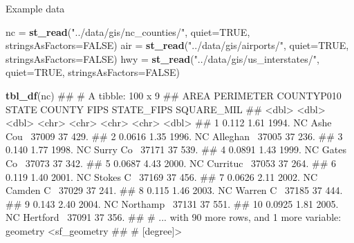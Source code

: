 \documentclass[11pt,ignorenonframetext,]{beamer}
\newenvironment{Shaded}{}{}
\newcommand{\DataTypeTok}[1]{\textcolor[rgb]{0.56,0.13,0.00}{#1}}
\newcommand{\KeywordTok}[1]{\textcolor[rgb]{0.00,0.44,0.13}{\textbf{#1}}}
\newcommand{\NormalTok}[1]{#1}
\newcommand{\OtherTok}[1]{\textcolor[rgb]{0.00,0.44,0.13}{#1}}
\newcommand{\StringTok}[1]{\textcolor[rgb]{0.25,0.44,0.63}{#1}}
\let\oldShaded\Shaded
\let\endoldShaded\endShaded
\renewenvironment{Shaded}{\footnotesize\begin{spacing}{0.9}\oldShaded}{\endoldShaded\end{spacing}}
\let\oldverbatim\verbatim
\let\endoldverbatim\endverbatim
\newcommand{\scriptoutput}{
  \renewenvironment{Shaded}{\scriptsize\begin{spacing}{0.9}\oldShaded}{\endoldShaded\end{spacing}}
  \renewenvironment{verbatim}{\scriptsize\begin{spacing}{0.9}\oldverbatim}{\endoldverbatim\end{spacing}}
}
\begin{document}
\begin{frame}[fragile,t]{Example data}
\protect\hypertarget{example-data}{}

\scriptoutput

\begin{Shaded}
\begin{Highlighting}[]
\NormalTok{nc  =}\StringTok{ }\KeywordTok{st_read}\NormalTok{(}\StringTok{"../data/gis/nc_counties/"}\NormalTok{, }\DataTypeTok{quiet=}\OtherTok{TRUE}\NormalTok{, }\DataTypeTok{stringsAsFactors=}\OtherTok{FALSE}\NormalTok{)}
\NormalTok{air =}\StringTok{ }\KeywordTok{st_read}\NormalTok{(}\StringTok{"../data/gis/airports/"}\NormalTok{, }\DataTypeTok{quiet=}\OtherTok{TRUE}\NormalTok{, }\DataTypeTok{stringsAsFactors=}\OtherTok{FALSE}\NormalTok{)}
\NormalTok{hwy =}\StringTok{ }\KeywordTok{st_read}\NormalTok{(}\StringTok{"../data/gis/us_interstates/"}\NormalTok{, }\DataTypeTok{quiet=}\OtherTok{TRUE}\NormalTok{, }\DataTypeTok{stringsAsFactors=}\OtherTok{FALSE}\NormalTok{)}

\KeywordTok{tbl_df}\NormalTok{(nc)}
\NormalTok{## # A tibble: 100 x 9}
\NormalTok{##      AREA PERIMETER COUNTYP010 STATE COUNTY    FIPS  STATE_FIPS SQUARE_MIL}
\NormalTok{##     <dbl>     <dbl>      <dbl> <chr> <chr>     <chr> <chr>           <dbl>}
\NormalTok{##  1 0.112       1.61      1994. NC    Ashe Cou~ 37009 37               429.}
\NormalTok{##  2 0.0616      1.35      1996. NC    Alleghan~ 37005 37               236.}
\NormalTok{##  3 0.140       1.77      1998. NC    Surry Co~ 37171 37               539.}
\NormalTok{##  4 0.0891      1.43      1999. NC    Gates Co~ 37073 37               342.}
\NormalTok{##  5 0.0687      4.43      2000. NC    Currituc~ 37053 37               264.}
\NormalTok{##  6 0.119       1.40      2001. NC    Stokes C~ 37169 37               456.}
\NormalTok{##  7 0.0626      2.11      2002. NC    Camden C~ 37029 37               241.}
\NormalTok{##  8 0.115       1.46      2003. NC    Warren C~ 37185 37               444.}
\NormalTok{##  9 0.143       2.40      2004. NC    Northamp~ 37131 37               551.}
\NormalTok{## 10 0.0925      1.81      2005. NC    Hertford~ 37091 37               356.}
\NormalTok{## # ... with 90 more rows, and 1 more variable: geometry <sf_geometry}
\NormalTok{## #   [degree]>}
\end{Highlighting}
\end{Shaded}

\end{frame}
\end{document}
